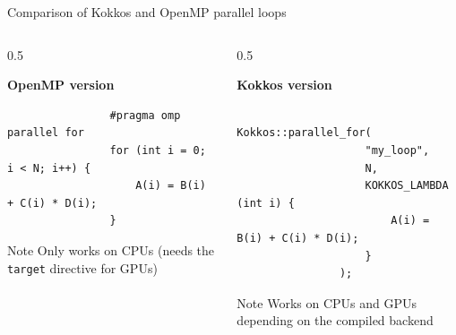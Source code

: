 \documentclass[
    aspectratio=169,
]{beamer}
\begin{document}
\begin{frame}[fragile]{Comparison of Kokkos and OpenMP parallel loops}
    \begin{columns}[T]
        \begin{column}{0.5\linewidth}
            \begin{center}
                \textbf{OpenMP version}
            \end{center}
            \begin{verbatim}
                #pragma omp parallel for
                for (int i = 0; i < N; i++) {
                    A(i) = B(i) + C(i) * D(i);
                }
            \end{verbatim}
            \begin{block}{Note}
                Only works on CPUs (needs the \texttt{target} directive for GPUs)
            \end{block}
        \end{column}
        \pause
        \begin{column}{0.5\linewidth}
            \begin{center}
                \textbf{Kokkos version}
            \end{center}
            \begin{verbatim}
                Kokkos::parallel_for(
                    "my_loop",
                    N,
                    KOKKOS_LAMBDA (int i) {
                        A(i) = B(i) + C(i) * D(i);
                    }
                );
            \end{verbatim}

            \vspace{-0.75em}

            \begin{block}{Note}
                Works on CPUs and GPUs depending on the compiled backend
            \end{block}
        \end{column}
    \end{columns}
\end{frame}
\end{document}
